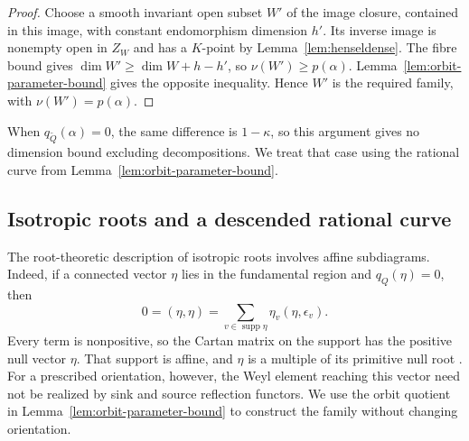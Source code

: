 \documentclass[11pt, reqno]{amsart}
\numberwithin{equation}{section}
\theoremstyle{definition}
\theoremstyle{remark}
\newcommand{\op}[1]{\operatorname{#1}}
\newcommand{\supp}{\op{supp}}
\newcommand{\Qbar}{\widetilde Q}
\begin{document}
\begin{proof}
Choose a smooth invariant open subset $W'$ of the image closure,
contained in this image, with constant endomorphism dimension $h'$.
Its inverse image is nonempty open in $Z_W$ and has a $K$-point by
Lemma~\ref{lem:henseldense}. The fibre bound gives
$\dim W'\ge\dim W+h-h'$, so $\nu(W')\ge p(\alpha)$.
Lemma~\ref{lem:orbit-parameter-bound} gives the opposite inequality.
Hence $W'$ is the required family, with $\nu(W')=p(\alpha)$.
\end{proof}

When $q_{\Qbar}(\alpha)=0$, the same difference is $1-\kappa$, so this
argument gives no dimension bound excluding decompositions. We treat
that case using the rational curve from
Lemma~\ref{lem:orbit-parameter-bound}.

\subsection{Isotropic roots and a descended rational curve}

The root-theoretic description of isotropic roots involves affine
subdiagrams. Indeed, if a connected vector $\eta$ lies in the
fundamental region and $q_Q(\eta)=0$, then
\[ 0=(\eta,\eta)=\sum_{v\in\supp\eta}\eta_v(\eta,\epsilon_v). \]
Every term is nonpositive, so the Cartan matrix on the support has
the positive null vector $\eta$. That support is affine, and $\eta$
is a multiple of its primitive null root \cite[Chapter~4]{KacBook}.
For a prescribed orientation, however, the Weyl element reaching this
vector need not be realized by sink and source reflection functors.
We use the orbit quotient in Lemma~\ref{lem:orbit-parameter-bound}
to construct the family without changing orientation.
\end{document}

